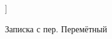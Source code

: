 \documentclass[a4paper, 12pt]{report}
\begin{document}
\begin{figure}[h]]
	\caption{Записка с пер. Перемётный}
	\label{pic:peremetnyy}
\end{figure}
\end{document}

